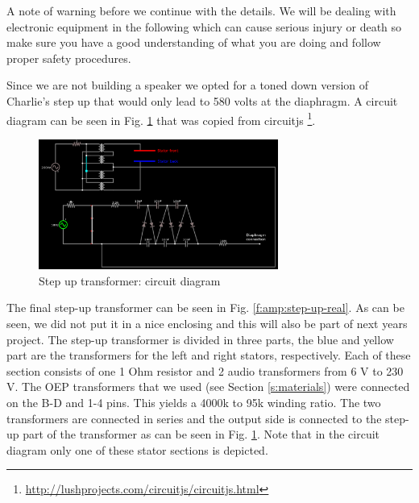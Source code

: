 \documentclass{article}
\begin{document}
A note of warning before we continue with the details. We will be dealing with electronic equipment in the following which can cause serious injury or death so make sure you have a good understanding of what you are doing and follow proper safety procedures.

Since we are not building a speaker we opted for a toned down version of Charlie's step up that would only lead to 580 volts at the diaphragm. A circuit diagram can be seen in Fig. \ref{f:amp:step-up} that was copied from circuitjs \footnote{\url{http://lushprojects.com/circuitjs/circuitjs.html}}.

\begin{figure}[htb]
    \centering
    \includegraphics[width=0.7\textwidth]{images/step-up-transformer.png}
    \caption{Step up transformer: circuit diagram}
    \label{f:amp:step-up}
\end{figure}

The final step-up transformer can be seen in Fig. \ref{f:amp:step-up-real}. As can be seen, we did not put it in a nice enclosing and this will also be part of next years project. The step-up transformer is divided in three parts, the blue and yellow part are the transformers for the left and right stators, respectively. Each of these section consists of one 1 Ohm resistor and 2 audio transformers from 6 V to 230 V. The OEP transformers that we used (see Section \ref{s:materials}) were connected on the B-D and 1-4 pins. This yields a 4000k to 95k winding ratio. The two transformers are connected in series and the output side is connected to the step-up part of the transformer as can be seen in Fig. \ref{f:amp:step-up}. Note that in the circuit diagram only one of these stator sections is depicted.
\end{document}
